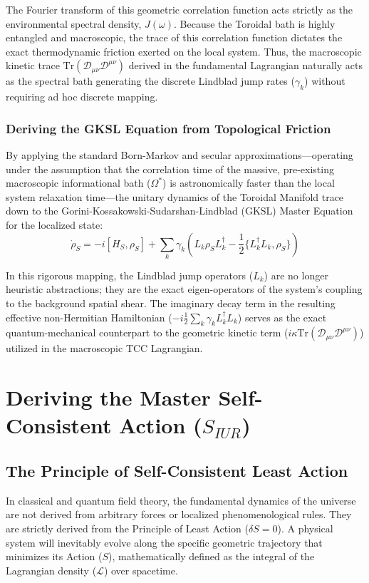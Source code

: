 \documentclass[12pt,openany]{book}
\theoremstyle{plain}
\theoremstyle{definition}
\theoremstyle{remark}
\begin{document}
The Fourier transform of this geometric correlation function acts strictly as the environmental spectral density, $J(\omega)$. Because the Toroidal bath is highly entangled and macroscopic, the trace of this correlation function dictates the exact thermodynamic friction exerted on the local system. Thus, the macroscopic kinetic trace $\text{Tr}(\mathcal{D}_{\mu\nu}\mathcal{D}^{\mu\nu})$ derived in the fundamental Lagrangian naturally acts as the spectral bath generating the discrete Lindblad jump rates ($\gamma_k$) without requiring ad hoc discrete mapping.

\subsection{Deriving the GKSL Equation from Topological Friction}

By applying the standard Born-Markov and secular approximations---operating under the assumption that the correlation time of the massive, pre-existing macroscopic informational bath ($\Omega^*$) is astronomically faster than the local system relaxation time---the unitary dynamics of the Toroidal Manifold trace down to the Gorini-Kossakowski-Sudarshan-Lindblad (GKSL) Master Equation for the localized state:
$$ \dot{\rho}_S = -i[H_S, \rho_S] + \sum_k \gamma_k \left( L_k \rho_S L_k^\dagger - \frac{1}{2} \{L_k^\dagger L_k, \rho_S\} \right) $$

In this rigorous mapping, the Lindblad jump operators ($L_k$) are no longer heuristic abstractions; they are the exact eigen-operators of the system's coupling to the background spatial shear. The imaginary decay term in the resulting effective non-Hermitian Hamiltonian ($-i \frac{1}{2} \sum_k \gamma_k L_k^\dagger L_k$) serves as the exact quantum-mechanical counterpart to the geometric kinetic term ($i\kappa \text{Tr}(\mathcal{D}_{\mu\nu}\mathcal{D}^{\mu\nu})$) utilized in the macroscopic TCC Lagrangian.

\chapter{Deriving the Master Self-Consistent Action ($S_{IUR}$)}

\section{The Principle of Self-Consistent Least Action}

In classical and quantum field theory, the fundamental dynamics of the universe are not derived from arbitrary forces or localized phenomenological rules. They are strictly derived from the Principle of Least Action ($\delta S = 0$). A physical system will inevitably evolve along the specific geometric trajectory that minimizes its Action ($S$), mathematically defined as the integral of the Lagrangian density ($\mathcal{L}$) over spacetime. 
\end{document}
